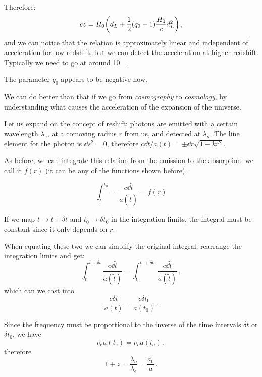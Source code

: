 \documentclass[main.tex]{subfiles}
\begin{document}
Therefore:
\begin{equation}
  cz = H_0 \qty(d_L + \frac{1}{2} (q_0 -1 ) \frac{H_0}{c} d_L^2)\,,
\end{equation}
%
and we can notice that the relation is approximately linear and independent of acceleration for low redshift, but we can detect the acceleration at higher redshift.
Typically we need to go at around \SI{10}{\mega\parsec}.

The parameter \(q_0 \) appears to be negative now.

We can do better than that if we go from \emph{cosmography} to \emph{cosmology}, by understanding what causes the acceleration of the expansion of the universe.

Let us expand on the concept of reshift:
photons are emitted with a certain wavelength \(\lambda_{e}\), at a comoving radius \(r\) from us, and detected at \(\lambda_{o}\).
The line element for the photon is \(\dd{s^2} =0\), therefore \(c\dd{t}/ a(t) = \pm \dd{r} \sqrt{1-kr^2} \).

As before, we can integrate this relation from the emission to the absorption: we call it \(f(r)\) (it can be any of the functions shown before).

\begin{equation}
  \int_{t}^{t_0 } = \frac{c\dd{\widetilde{t}}}{a(\widetilde{t})} = f(r)
\end{equation}

If we map \(t \rightarrow t + \delta t\) and \(t_0 \rightarrow \delta t_0 \) in the integration limits, the integral must be constant since it only depends on \(r\).

When equating these two we can simplify the original integral, rearrange the integration limits and get:
\begin{equation}
  \int_{t}^{t + \delta t} \frac{c\dd{\widetilde{t}}}{a(\widetilde{t})} = \int_{t_0 }^{t_0 + \delta t_0 } \frac{c\dd{\widetilde{t}}}{a(\widetilde{t})}\,,
\end{equation}
%
which can we cast into
\begin{equation}
  \frac{c \delta t}{a(t)} =   \frac{c \delta t_0 }{a(t_0 )}\,.
\end{equation}

Since the frequency must be proportional to the inverse of the time intervals \(\delta t\) or \(\delta t_0 \), we have
\begin{equation}
  \nu_{e} a(t_{e}) = \nu_{o} a(t_{o})\,,
\end{equation}
%
therefore 
%
\begin{equation}
  1 + z = \frac{\lambda_{o}}{\lambda_{e}}
  = \frac{a_0 }{a}\,.
\end{equation}
\end{document}
